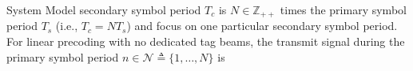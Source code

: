 \documentclass[journal]{IEEEtran}
\begin{document}
\begin{section}{System Model}
secondary symbol period $T_c$ is $N \in \mathbb{Z}_{++}$ times the primary symbol period $T_s$ (i.e., $T_c=NT_s$) and focus on one particular secondary symbol period. For linear precoding with no dedicated tag beams, the transmit signal during the primary symbol period $n \in \mathcal{N} \triangleq \{1,\ldots,N\}$ is

\end{section}
\end{document}
